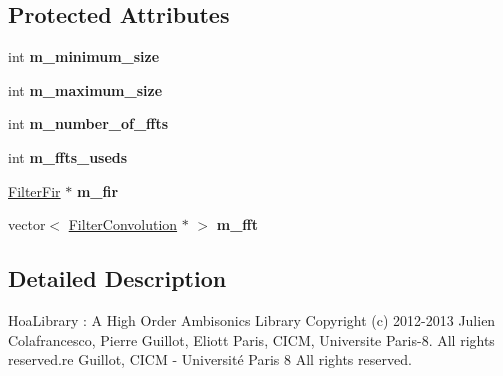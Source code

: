 \subsection*{Protected Attributes}
\begin{DoxyCompactItemize}
\item 
\hypertarget{class_filter_convolution_zero_a8db018405cb92c917d02f20d45b2dd65}{int {\bfseries m\-\_\-minimum\-\_\-size}}\label{class_filter_convolution_zero_a8db018405cb92c917d02f20d45b2dd65}

\item 
\hypertarget{class_filter_convolution_zero_add9e349da32a20fd6186edb0e28b92fc}{int {\bfseries m\-\_\-maximum\-\_\-size}}\label{class_filter_convolution_zero_add9e349da32a20fd6186edb0e28b92fc}

\item 
\hypertarget{class_filter_convolution_zero_a9069f23a84d1c2f46f2c640e5be61897}{int {\bfseries m\-\_\-number\-\_\-of\-\_\-ffts}}\label{class_filter_convolution_zero_a9069f23a84d1c2f46f2c640e5be61897}

\item 
\hypertarget{class_filter_convolution_zero_a4e6d5c985380124f57b86ab70bbe509c}{int {\bfseries m\-\_\-ffts\-\_\-useds}}\label{class_filter_convolution_zero_a4e6d5c985380124f57b86ab70bbe509c}

\item 
\hypertarget{class_filter_convolution_zero_a201baa7ff84ae7b09df236627de03448}{\hyperlink{class_filter_fir}{Filter\-Fir} $\ast$ {\bfseries m\-\_\-fir}}\label{class_filter_convolution_zero_a201baa7ff84ae7b09df236627de03448}

\item 
\hypertarget{class_filter_convolution_zero_a03a3c81b87a781da55a97dd40aacdd68}{vector$<$ \hyperlink{class_filter_convolution}{Filter\-Convolution} $\ast$ $>$ {\bfseries m\-\_\-fft}}\label{class_filter_convolution_zero_a03a3c81b87a781da55a97dd40aacdd68}

\end{DoxyCompactItemize}


\subsection{Detailed Description}
Hoa\-Library \-: A High Order Ambisonics Library Copyright (c) 2012-\/2013 Julien Colafrancesco, Pierre Guillot, Eliott Paris, C\-I\-C\-M, Universite Paris-\/8. All rights reserved.\-re Guillot, C\-I\-C\-M -\/ Université Paris 8 All rights reserved.

